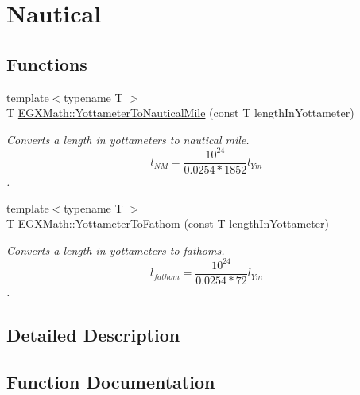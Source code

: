 \hypertarget{group___e_g_x_math-_conversions-_length_conversions-_yottameter-_nautical}{}\section{Nautical}
\label{group___e_g_x_math-_conversions-_length_conversions-_yottameter-_nautical}
\subsection*{Functions}
\begin{DoxyCompactItemize}
\item 
{\footnotesize template$<$typename T $>$ }\\T \mbox{\hyperlink{group___e_g_x_math-_conversions-_length_conversions-_yottameter-_nautical_ga455b7f16dd9ff68f759f366def111300}{E\+G\+X\+Math\+::\+Yottameter\+To\+Nautical\+Mile}} (const T length\+In\+Yottameter)
\begin{DoxyCompactList}\small\item\em Converts a length in yottameters to nautical mile. \[ l_{NM}= \frac{10^{24}}{0.0254 * 1852} l_{Ym} \]. \end{DoxyCompactList}\item 
{\footnotesize template$<$typename T $>$ }\\T \mbox{\hyperlink{group___e_g_x_math-_conversions-_length_conversions-_yottameter-_nautical_ga602afc490045a91db8931798e6ee4bbd}{E\+G\+X\+Math\+::\+Yottameter\+To\+Fathom}} (const T length\+In\+Yottameter)
\begin{DoxyCompactList}\small\item\em Converts a length in yottameters to fathoms. \[ l_{fathom}= \frac{10^{24}}{0.0254 * 72} l_{Ym} \]. \end{DoxyCompactList}\end{DoxyCompactItemize}


\subsection{Detailed Description}


\subsection{Function Documentation}
\mbox{\label{group___e_g_x_math-_conversions-_length_conversions-_yottameter-_nautical_ga602afc490045a91db8931798e6ee4bbd}} 
